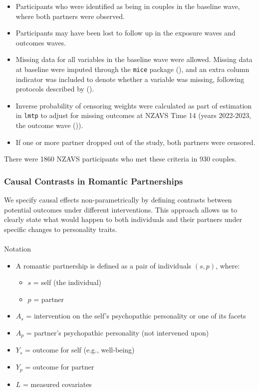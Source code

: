 \documentclass[
  single column]{article}
\makeatletter
\let\oldparagraph\paragraph
\renewcommand{\paragraph}{
    \@ifstar
      \xxxParagraphStar
      \xxxParagraphNoStar
  }
\newcommand{\xxxParagraphStar}[1]{\oldparagraph*{#1}\mbox{}}
\newcommand{\xxxParagraphNoStar}[1]{\oldparagraph{#1}\mbox{}}
\providecommand{\tightlist}{%
  \setlength{\itemsep}{0pt}\setlength{\parskip}{0pt}}\usepackage{longtable,booktabs,array}
\makeatother
\begin{document}
\begin{itemize}
\tightlist
\item
  Participants who were identified as being in couples in the baseline
  wave, where both partners were observed.
\item
  Participants may have been lost to follow up in the exposure waves and
  outcomes waves.
\item
  Missing data for all variables in the baseline wave were allowed.
  Missing data at baseline were imputed through the \texttt{mice}
  package (), and an extra
  column indicator was included to denote whether a variable was
  missing, following protocols described by
  ().
\item
  Inverse probability of censoring weights were calculated as part of
  estimation in \texttt{lmtp} to adjust for missing outcomes at NZAVS
  Time 14 (years 2022-2023, the outcome wave
  ()).
\item
  If one or more partner dropped out of the study, both partners were
  censored.
\end{itemize}

There were 1860 NZAVS participants who met these criteria in 930
couples.

\subsubsection{Causal Contrasts in Romantic
Partnerships}\label{causal-contrasts-in-romantic-partnerships}

We specify causal effects non-parametrically by defining contrasts
between potential outcomes under different interventions. This approach
allows us to clearly state what would happen to both individuals and
their partners under specific changes to personality traits.

\paragraph{Notation}\label{notation}

\begin{itemize}
\tightlist
\item
  A romantic partnership is defined as a pair of individuals \((s, p)\),
  where:

  \begin{itemize}
  \tightlist
  \item
    \(s\) = self (the individual)
  \item
    \(p\) = partner
  \end{itemize}
\item
  \(A_s\) = intervention on the self's psychopathic personality or one
  of its facets
\item
  \(A_p\) = partner's psychopathic personality (not intervened upon)
\item
  \(Y_s\) = outcome for self (e.g., well-being)
\item
  \(Y_p\) = outcome for partner
\item
  \(L\) = measured covariates
\end{itemize}
\end{document}
